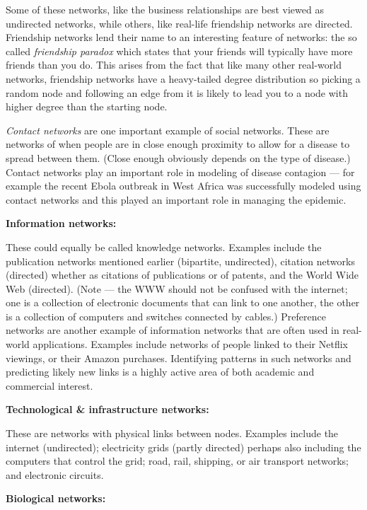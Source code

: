 \documentclass{article}
\begin{document}
Some of these networks, like the business relationships are best viewed as undirected networks, while others, like real-life friendship networks are directed. Friendship networks lend their name to an interesting feature of networks: the so called \emph{friendship paradox} which states that your friends will typically have more friends than you do. This arises from the fact that like many other real-world networks, friendship networks have a heavy-tailed degree distribution so picking a random node and following an edge from it is likely to lead you to a node with higher degree than the starting node.

\emph{Contact networks} are one important example of social networks. These are networks of when people are in close enough proximity to allow for a disease to spread between them. (Close enough obviously depends on the type of disease.) Contact networks play an important role in modeling of disease contagion --- for example the recent Ebola outbreak in West Africa was successfully modeled using contact networks and this played an important role in managing the epidemic.



{\bf Information networks:}

These could equally be called knowledge networks. Examples include the publication networks mentioned earlier (bipartite, undirected), citation networks (directed) whether as citations of publications or of patents, and the World Wide Web (directed). (Note --- the WWW should not be confused with the internet; one is a collection of electronic documents that can link to one another, the other is a collection of computers and switches connected by cables.) Preference networks are another example of information networks that are often used in real-world applications. Examples include networks of people linked to their Netflix viewings, or their Amazon purchases. Identifying patterns in such networks and predicting likely new links is a highly active area of both academic and commercial interest.


{\bf Technological \& infrastructure networks:} 

These are networks with physical links between nodes. Examples include the internet (undirected); electricity grids (partly directed) perhaps also including the computers that control the grid; road, rail, shipping, or air transport networks; and electronic circuits. 


{\bf Biological networks:} 
\end{document}
